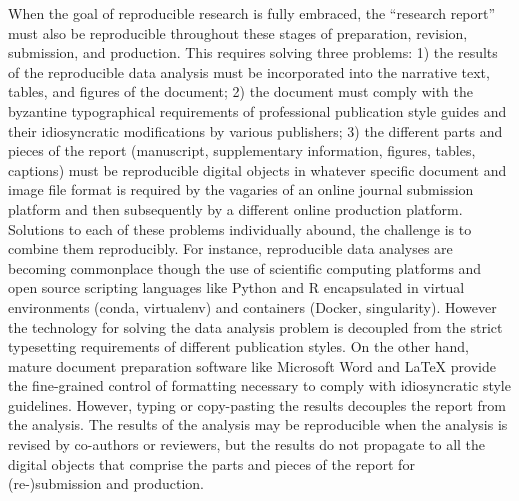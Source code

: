 \documentclass[helv,10pt,man,floatsintext]{apa6}  %
\begin{document}
When the goal of reproducible research is fully embraced, the
``research report'' must also be reproducible throughout these stages
of preparation, revision, submission, and production. This requires
solving three problems: 1) the results of the reproducible data
analysis must be incorporated into the narrative text, tables, and
figures of the document; 2) the document must comply with the
byzantine typographical requirements of professional publication style
guides and their idiosyncratic modifications by various publishers; 3)
the different parts and pieces of the report (manuscript,
supplementary information, figures, tables, captions) must be
reproducible digital objects in whatever specific document and image
file format is required by the vagaries of an online journal
submission platform and then subsequently by a different online
production platform. Solutions to each of these problems individually
abound, the challenge is to combine them reproducibly. For instance,
reproducible data analyses are becoming commonplace though the use of
scientific computing platforms and open source scripting languages
like Python and R encapsulated in virtual environments (conda,
virtualenv) and containers (Docker, singularity). However the
technology for solving the data analysis problem is decoupled from the
strict typesetting requirements of different publication styles. On
the other hand, mature document preparation software like Microsoft
Word and \LaTeX{} provide the fine-grained control of formatting
necessary to comply with idiosyncratic style guidelines. However,
typing or copy-pasting the results decouples the report from the
analysis.  The results of the analysis may be reproducible when the
analysis is revised by co-authors or reviewers, but the results do not
propagate to all the digital objects that comprise the parts and
pieces of the report for (re-)submission and production.
\end{document}
